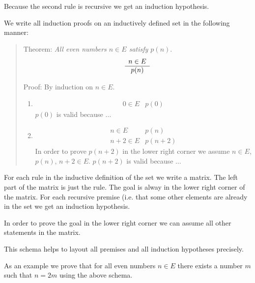 Because the second rule is recursive we get an induction hypothesis.

We write all induction proofs on an inductively defined set in the following
manner:

\begin{quote}
    Theorem: \emph{All even numbers $n \in E$ satisfy $p(n)$}.
    $$
    \begin{array}{c} n \in E \\ \hline p(n)\end{array}
    $$

    Proof: By induction on $n \in E$.
    \begin{enumerate}
    \item
        $$
        \begin{array}{l|l}
        0 \in E
        & p(0)
        \end{array}
        $$
        $p(0)$ is valid because $\ldots$

    \item
        $$
        \begin{array}{l|l}
            n \in E
            &
            p(n)
            \\
            \hline
            n+2 \in E
            &
            p(n+2)
        \end{array}
        $$
        In order to prove $p(n+2)$ in the lower right corner we assume $n \in
        E$, $p(n)$, $n+2 \in E$. $p(n+2)$ is valid because $\ldots$
    \end{enumerate}
\end{quote}

For each rule in the inductive definition of the set we write a matrix. The left
part of the matrix is just the rule. The goal is alway in the lower right corner
of the matrix. For each recursive premise (i.e. that some other elements are
already in the set we get an induction hypothesis.

In order to prove the goal in the lower right corner we can assume all other
statements in the matrix.

This schema helps to layout all premises and all induction hypotheses precisely.

As an example we prove that for all even numbers $n \in E$ there exists a number
$m$ such that $n = 2m$ using the above schema.

